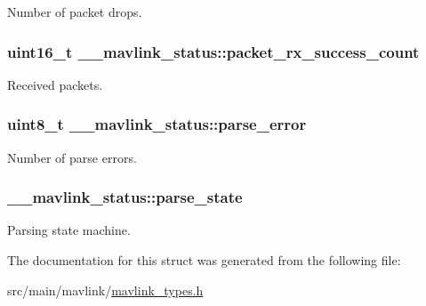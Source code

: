 Number of packet drops. 

\hypertarget{struct____mavlink__status_aa088f67773cdf9ff541c5880e65cee68}{
\subsubsection[{packet\+\_\+rx\+\_\+success\+\_\+count}]{\setlength{\rightskip}{0pt plus 5cm}uint16\+\_\+t \+\_\+\+\_\+mavlink\+\_\+status\+::packet\+\_\+rx\+\_\+success\+\_\+count}}\label{struct____mavlink__status_aa088f67773cdf9ff541c5880e65cee68}


Received packets. 

\hypertarget{struct____mavlink__status_ae7a52aa0c84929dbf181220c689f9ec8}{
\subsubsection[{parse\+\_\+error}]{\setlength{\rightskip}{0pt plus 5cm}uint8\+\_\+t \+\_\+\+\_\+mavlink\+\_\+status\+::parse\+\_\+error}}\label{struct____mavlink__status_ae7a52aa0c84929dbf181220c689f9ec8}


Number of parse errors. 

\hypertarget{struct____mavlink__status_aaf6742a61bbc641a4600184b3260fa0f}{
\subsubsection[{parse\+\_\+state}]{ \+\_\+\+\_\+mavlink\+\_\+status\+::parse\+\_\+state}}\label{struct____mavlink__status_aaf6742a61bbc641a4600184b3260fa0f}


Parsing state machine. 



The documentation for this struct was generated from the following file\+:\begin{DoxyCompactItemize}
\item 
src/main/mavlink/\hyperlink{mavlink__types_8h}{mavlink\+\_\+types.\+h}\end{DoxyCompactItemize}
